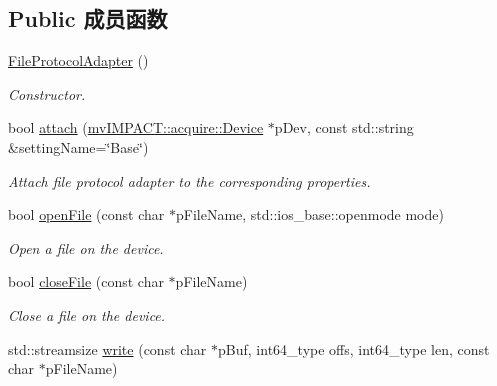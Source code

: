 \subsection*{Public 成员函数}
\begin{DoxyCompactItemize}
\item 
\hypertarget{classmv_i_m_p_a_c_t_1_1acquire_1_1_gen_i_cam_1_1_file_protocol_adapter_a9fbeda8fcbc8e475f629159309d0344f}{\hyperlink{classmv_i_m_p_a_c_t_1_1acquire_1_1_gen_i_cam_1_1_file_protocol_adapter_a9fbeda8fcbc8e475f629159309d0344f}{File\+Protocol\+Adapter} ()}\label{classmv_i_m_p_a_c_t_1_1acquire_1_1_gen_i_cam_1_1_file_protocol_adapter_a9fbeda8fcbc8e475f629159309d0344f}

\begin{DoxyCompactList}\small\item\em Constructor. \end{DoxyCompactList}\item 
bool \hyperlink{classmv_i_m_p_a_c_t_1_1acquire_1_1_gen_i_cam_1_1_file_protocol_adapter_a6b697a1b2250aca9e7b118d83f7e12ac}{attach} (\hyperlink{classmv_i_m_p_a_c_t_1_1acquire_1_1_device}{mv\+I\+M\+P\+A\+C\+T\+::acquire\+::\+Device} $\ast$p\+Dev, const std\+::string \&setting\+Name=\char`\"{}Base\char`\"{})
\begin{DoxyCompactList}\small\item\em Attach file protocol adapter to the corresponding properties. \end{DoxyCompactList}\item 
bool \hyperlink{classmv_i_m_p_a_c_t_1_1acquire_1_1_gen_i_cam_1_1_file_protocol_adapter_a849322aeba6552b08ac0ef4c69c390b0}{open\+File} (const char $\ast$p\+File\+Name, std\+::ios\+\_\+base\+::openmode mode)
\begin{DoxyCompactList}\small\item\em Open a file on the device. \end{DoxyCompactList}\item 
bool \hyperlink{classmv_i_m_p_a_c_t_1_1acquire_1_1_gen_i_cam_1_1_file_protocol_adapter_a89f55f99f0e20b79d2d7258f04fc5804}{close\+File} (const char $\ast$p\+File\+Name)
\begin{DoxyCompactList}\small\item\em Close a file on the device. \end{DoxyCompactList}\item 
std\+::streamsize \hyperlink{classmv_i_m_p_a_c_t_1_1acquire_1_1_gen_i_cam_1_1_file_protocol_adapter_a6fb017f1185bb2d85069dd77d50654b9}{write} (const char $\ast$p\+Buf, int64\+\_\+type offs, int64\+\_\+type len, const char $\ast$p\+File\+Name)

\end{DoxyCompactItemize}
